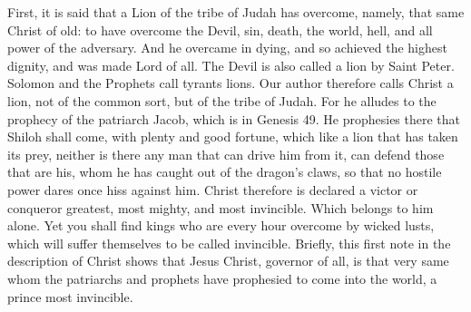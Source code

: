 First, it is said that a Lion of the tribe of Judah has overcome, namely, that same Christ of old: to have overcome the Devil, sin, death, the world, hell, and all power of the adversary. And he overcame in dying, and so achieved the highest dignity, and was made Lord of all. The Devil is also called a lion by Saint Peter. Solomon and the Prophets call tyrants lions. Our author therefore calls Christ a lion, not of the common sort, but of the tribe of Judah. For he alludes to the prophecy of the patriarch Jacob, which is in Genesis 49. He prophesies there that Shiloh shall come, with plenty and good fortune, which like a lion that has taken its prey, neither is there any man that can drive him from it, can defend those that are his, whom he has caught out of the dragon’s claws, so that no hostile power dares once hiss against him. Christ therefore is declared a victor or conqueror greatest, most mighty, and most invincible. Which belongs to him alone. Yet you shall find kings who are every hour overcome by wicked lusts, which will suffer themselves to be called invincible. Briefly, this first note in the description of Christ shows that Jesus Christ, governor of all, is that very same whom the patriarchs and prophets have prophesied to come into the world, a prince most invincible.

